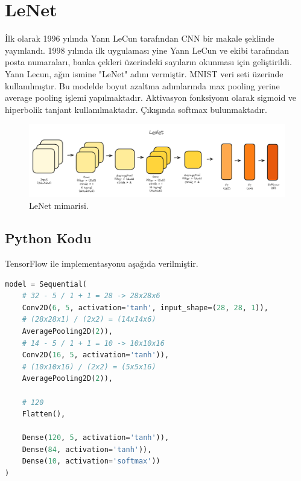\section{LeNet}
İlk olarak 1996 yılında Yann LeCun tarafından CNN bir makale şeklinde yayınlandı. 1998 yılında ilk uygulaması yine Yann LeCun ve ekibi tarafından posta numaraları, banka çekleri üzerindeki sayıların okunması için geliştirildi. Yann Lecun, ağın ismine "LeNet" adını vermiştir. MNIST veri seti üzerinde kullanılmıştır. Bu modelde boyut azaltma adımlarında max pooling yerine average pooling işlemi yapılmaktadır. Aktivasyon fonksiyonu olarak sigmoid ve hiperbolik tanjant kullanılmaktadır. Çıkışında softmax bulunmaktadır.

\begin{figure}[h]
    \centering
    \includegraphics[width=1\textwidth]{images/lenet.png}
    \caption{LeNet mimarisi.}
    \label{fig:enter-label}
\end{figure}

\subsection{Python Kodu}

TensorFlow ile implementasyonu aşağıda verilmiştir.

\begin{lstlisting}[language=Python]
model = Sequential(
	# 32 - 5 / 1 + 1 = 28 -> 28x28x6
	Conv2D(6, 5, activation='tanh', input_shape=(28, 28, 1)),
	# (28x28x1) / (2x2) = (14x14x6)
	AveragePooling2D(2)),
	# 14 - 5 / 1 + 1 = 10 -> 10x10x16
	Conv2D(16, 5, activation='tanh')),
	# (10x10x16) / (2x2) = (5x5x16)
	AveragePooling2D(2)),

	# 120
	Flatten(),

	Dense(120, 5, activation='tanh')),
	Dense(84, activation='tanh')),
	Dense(10, activation='softmax'))
)
\end{lstlisting}

\newpage
